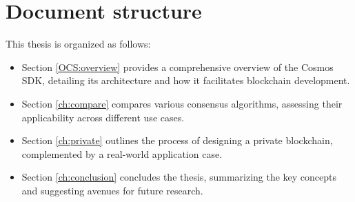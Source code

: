 \section{Document structure}

This thesis is organized as follows:

\begin{itemize}
    \item Section \ref{OCS:overview} provides a comprehensive overview of the Cosmos SDK, detailing its architecture and how it facilitates blockchain development.
    \item Section \ref{ch:compare} compares various consensus algorithms, assessing their applicability across different use cases.
    \item Section \ref{ch:private} outlines the process of designing a private blockchain, complemented by a real-world application case.
    \item Section \ref{ch:conclusion} concludes the thesis, summarizing the key concepts and suggesting avenues for future research.
\end{itemize}
